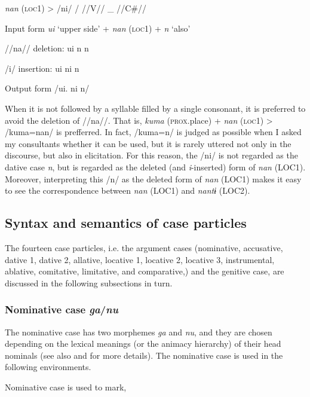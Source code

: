 \begin{table}
\ea\label{ex:6-40}
  \textit{nan}  (\textsc{loc}1)  >  /ni/  /  //V//  \_  //C\#//

\ea\label{ex:6-41}
  Input form  \textit{ui}  ‘upper side’  +  \textit{nan}  (\textsc{loc}1)  +  \textit{n}  ‘also’

  //na// deletion:  ui      n      n  

  /i/ insertion:  ui      ni      n  

  Output form  /ui.      ni      n/  

When it is not followed by a syllable filled by a single consonant, it is preferred to avoid the deletion of //na//. That is, \textit{kuma} (\textsc{prox}.place) + \textit{nan} (\textsc{loc}1) > /kuma=nan/ is prefferred. In fact, /kuma=n/ is judged as possible when I asked my consultants whether it can be used, but it is rarely uttered not only in the discourse, but also in elicitation. For this reason, the /ni/ is not regarded as the dative case \textit{n}, but is regarded as the deleted (and \textit{i}-inserted) form of \textit{nan} (LOC1). Moreover, interpreting this /n/ as the deleted form of \textit{nan} (LOC1) makes it easy to see the correspondence between \textit{nan} (LOC1) and \textit{nantɨ} (LOC2).

\subsection{Syntax and semantics of case particles}

The fourteen case particles, i.e. the argument cases (nominative, accusative, dative 1, dative 2, allative, locative 1, locative 2, locative 3, instrumental, ablative, comitative, limitative, and comparative,) and the genitive case, are discussed in the following subsections in turn.

\subsubsection{Nominative case \textit{ga}/\textit{nu}}
\label{bkm:Ref366360662}
The nominative case has two morphemes \textit{ga} and \textit{nu}, and they are chosen depending on the lexical meanings (or the animacy hierarchy) of their head nominals (see also  and  for more details). The nominative case is used in the following environments.

\ea\label{ex:6-42}
 Nominative case is used to mark,\\


\end{table}
